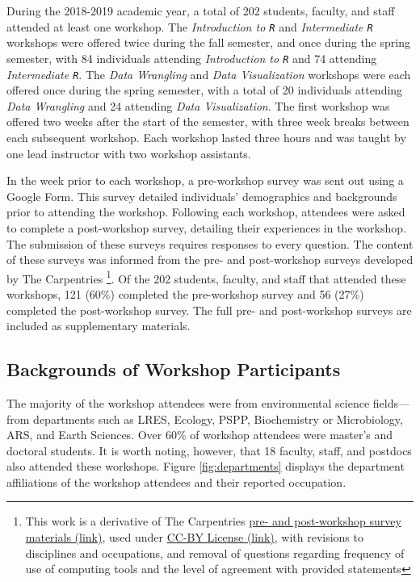 \documentclass[12pt]{article}
\newcommand{\R}{\texttt{R}}
\begin{document}
\noindent During the 2018-2019 academic year, a total of 202 students, faculty,
and staff attended at least one workshop. The \emph{Introduction to \R} and
\emph{Intermediate \R} workshops were offered twice during the fall semester,
and once during the spring semester, with 84 individuals attending 
\emph{Introduction to \R} and 74 attending \emph{Intermediate \R}. The 
\emph{Data Wrangling} and \emph{Data Visualization} workshops were each offered
once during the spring semester, with a total of 20 individuals attending 
\emph{Data Wrangling} and 24 attending \emph{Data Visualization}. The first
workshop was offered two weeks after the start of the semester, with three week
breaks between each subsequent workshop. Each workshop lasted three hours and
was taught by one lead instructor with two workshop assistants. 

\quad In the week prior to each workshop, a pre-workshop survey was
sent out using a Google Form. This survey detailed individuals' demographics and
backgrounds prior to attending the workshop. Following each workshop, attendees
were asked to complete a post-workshop survey, detailing their experiences in
the workshop. The submission of these surveys requires responses to every
question. The content of these surveys was informed from the pre- and
post-workshop surveys developed by The Carpentries \footnote{This work is a
derivative of The Carpentries \href{https://carpentries.org/assessment/}{pre-
and post-workshop survey materials (link)}, used under 
\href{https://creativecommons.org/licenses/by/4.0/}{CC-BY License (link)}, with
revisions to disciplines and occupations, and removal of questions regarding
frequency of use of computing tools and the level of agreement with provided
statements}. Of the 202 students, faculty, and staff that attended these
workshops, 121 (60\%) completed the pre-workshop survey and 56 (27\%) completed
the post-workshop survey. The full pre- and post-workshop surveys are included
as supplementary materials.

\subsection{Backgrounds of Workshop Participants}

\noindent The majority of the workshop attendees were from environmental science
fields---from departments such as LRES, Ecology, PSPP, Biochemistry or
Microbiology, ARS, and Earth Sciences. Over 60\% of workshop attendees were
master's and doctoral students. It is worth noting, however, that 18 faculty,
staff, and postdocs also attended these workshops. Figure \ref{fig:departments}
displays the department affiliations of the workshop attendees and their
reported occupation. 
\end{document}

